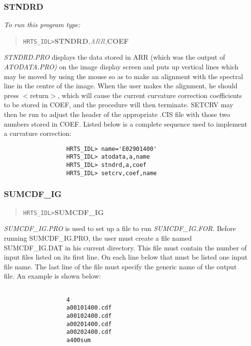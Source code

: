 \subsubsection{STNDRD}

{\em To run this program type:}

\begin{quote}
     {\tt HRTS\_IDL>}{\bf STNDRD},{\it ARR},{\bf COEF}
\end{quote}
{\em STNDRD.PRO} displays the data stored in ARR (which was the output of
{\em ATODATA.PRO)} on the image display screen and puts up vertical lines which
may be
   moved by using the mouse so as to make an alignment with the spectral
   line in the centre of the image.  When the user makes the alignment, he
   should press $<$return$>$, which will cause the current curvature
   correction coefficients to be stored in COEF, and the procedure will
   then terminate.  SETCRV may then be run to adjust the header of the
   appropriate .CIS file with those two numbers stored in COEF.
      Listed below is a complete sequence used to implement a curvature
   correction:
\begin{verbatim}
                  HRTS_IDL> name='E02901400'
                  HRTS_IDL> atodata,a,name
                  HRTS_IDL> stndrd,a,coef
                  HRTS_IDL> setcrv,coef,name
\end{verbatim}

\subsubsection{SUMCDF\_IG}

\begin{quote}
     {\tt HRTS\_IDL>}{\bf SUMCDF\_IG}
\end{quote}
{\em SUMCDF\_IG.PRO} is used to set up a file to run {\em SUMCDF\_IG.FOR.}
   Before running SUMCDF\_IG.PRO, the user must create a file named
   SUMCDF\_IG.DAT in his current directory.  This file must contain the
   number of input files listed on its first line.  On each line below
   that must be listed one input file name.  The last line of the file
   must specify the generic name of the output file.  An example is shown
   below:
\begin{center}
\begin{verbatim}

                  4
                  a00101400.cdf
                  a00102400.cdf
                  a00201400.cdf
                  a00202400.cdf
                  a400sum

\end{verbatim}
\end{center}


